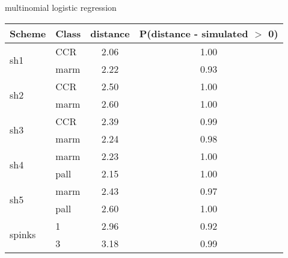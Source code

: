 \begin{subtable}[b]{0.3\textwidth}
  \caption{multinomial logistic regression}
  \centering
  \begin{tabular}{ l | l c c }
    \hline
    Scheme & Class & distance & P(distance - simulated \(>\) 0)\\ 
    \hline
    \hline
    \multirow{2}{*}{sh1} & CCR & 2.06 & 1.00 \\ 
    & marm & 2.22 & 0.93 \\ 
    \hline
    \multirow{2}{*}{sh2} & CCR & 2.50 & 1.00 \\ 
    & marm & 2.60 & 1.00 \\ 
    \hline
    \multirow{2}{*}{sh3} & CCR & 2.39 & 0.99 \\ 
    & marm & 2.24 & 0.98 \\ 
    \hline
    \multirow{2}{*}{sh4} & marm & 2.23 & 1.00 \\ 
    & pall & 2.15 & 1.00 \\ 
    \hline
    \multirow{2}{*}{sh5} & marm & 2.43 & 0.97 \\ 
    & pall & 2.60 & 1.00 \\ 
    \hline
    \multirow{2}{*}{spinks} & 1 & 2.96 & 0.92 \\ 
    & 3 & 3.18 & 0.99 \\ 
    \hline
  \end{tabular}
  \label{mmmiss}
\end{subtable}
